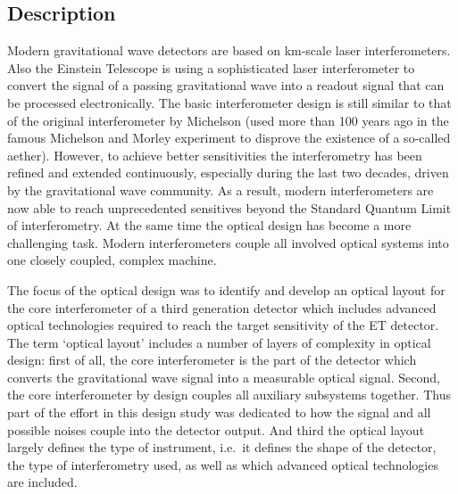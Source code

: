 




\FloatBarrier
\subsection{Description}

Modern gravitational wave detectors are based on km-scale laser interferometers.
Also the Einstein Telescope is using a sophisticated laser
interferometer
to convert the signal of a passing gravitational wave into a readout
signal that can be processed electronically. The basic
interferometer design is still similar to that of the original
interferometer by Michelson (used more than 100 years ago in the famous Michelson and Morley
experiment to disprove the existence of a so-called aether). However,
to achieve better sensitivities 
the interferometry has been refined and extended continuously, especially during
the last two decades, driven by the gravitational wave community. As a result, modern
interferometers are now able to reach unprecedented sensitives beyond the Standard
Quantum Limit of interferometry. At the same time the optical design
has become a more challenging task. Modern interferometers couple all
involved optical systems into one closely coupled, complex machine. 

The focus of the optical design was to identify and develop an optical layout for the
core interferometer of a third generation detector which includes
advanced optical technologies required to reach the target sensitivity
of the ET detector. The term `optical layout'  includes a number of
layers of complexity in optical design: first of all, the core
interferometer is the part of the detector which converts the
gravitational wave signal into a measurable optical signal. Second,
the core interferometer by design couples all auxiliary subsystems
together. Thus part of the effort in this design study was dedicated to how the
signal and all possible noises couple into the detector output.  And
third the optical layout largely defines the type of instrument,
i.e.\ it defines the shape of the detector, the type of interferometry
used, as well as which advanced optical technologies are included.

